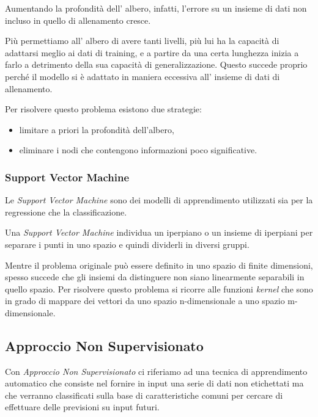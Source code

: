 \documentclass[a4paper,12pt]{report}
\begin{document}
Aumentando la profondità dell' albero, infatti, l'errore su un insieme di dati non incluso in quello di allenamento cresce.

Più permettiamo all’ albero di avere tanti livelli, più lui ha la capacità di adattarsi meglio ai dati di training, e a partire da una certa lunghezza inizia a farlo a detrimento della sua capacità di generalizzazione. Questo succede proprio perché il modello si è adattato in maniera eccessiva all’ insieme di dati di allenamento.

Per risolvere questo problema esistono due strategie:
\begin{itemize}
    \item limitare a priori la profondità dell'albero, 
    \item eliminare i nodi che contengono informazioni poco significative.
\end{itemize}

\subsubsection{Support Vector Machine}
Le \textit{Support Vector Machine} sono dei modelli di apprendimento utilizzati sia per la regressione che la classificazione.

Una \textit{Support Vector Machine} individua un iperpiano o un insieme di iperpiani per separare i punti in uno spazio e quindi dividerli in diversi gruppi.

Mentre il problema originale può essere definito in uno spazio di finite dimensioni, spesso succede che gli insiemi da distinguere non siano linearmente separabili in quello spazio. Per risolvere questo problema si ricorre alle funzioni \textit{kernel} che sono in grado di mappare dei vettori da uno spazio n-dimensionale a uno spazio m-dimensionale.

\subsection*{Approccio Non Supervisionato}
Con \textit{Approccio Non Supervisionato} ci riferiamo ad una tecnica di apprendimento automatico che consiste nel fornire in input una serie di dati non etichettati ma che verranno classificati sulla base di caratteristiche comuni  per cercare di effettuare delle previsioni su input futuri.


\end{document}
